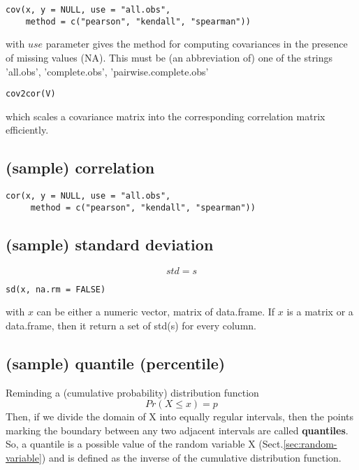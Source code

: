 \begin{verbatim}
cov(x, y = NULL, use = "all.obs",
    method = c("pearson", "kendall", "spearman"))
\end{verbatim}
with $use$ parameter gives the method for computing covariances in the
presence of missing values (NA). This must be (an abbreviation of) one
of the strings 'all.obs', 'complete.obs', 'pairwise.complete.obs'


\begin{verbatim}
cov2cor(V)
\end{verbatim}
which scales a covariance matrix into the corresponding correlation
matrix efficiently.



\subsection{(sample) correlation}
\label{sec:sample-correlation}

\begin{verbatim}
cor(x, y = NULL, use = "all.obs",
     method = c("pearson", "kendall", "spearman"))
\end{verbatim}

\subsection{(sample) standard deviation}
\label{sec:sample-stand-devi}

\begin{equation}
  \label{eq:11}
  std = s
\end{equation}

\begin{verbatim}
sd(x, na.rm = FALSE)
\end{verbatim}
with $x$ can be either a numeric vector,  matrix of data.frame. If $x$
is a matrix or a data.frame, then it return a set of std(s) for every column.

\subsection{(sample) quantile (percentile)}
\label{sec:sample-quant-perc}

Reminding a (cumulative probability) distribution function 
\begin{equation}
  \label{eq:21}
  Pr(X \le x) = p
\end{equation}
Then, if we divide the domain of X into equally regular intervals,
then the points marking the boundary between any two adjacent
intervals are called {\bf quantiles}. So, a quantile is a possible
value of the random variable X (Sect.\ref{sec:random-variable}) and is defined
as the inverse of the cumulative distribution function.

